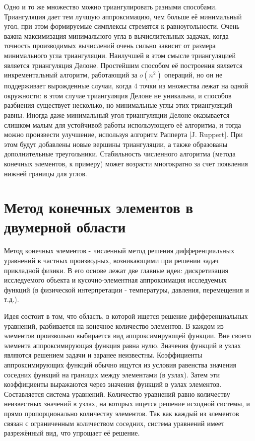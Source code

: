 \documentclass[14pt]{extreport}
\begin{document}
Одно и то же множество можно триангулировать разными способами. Триангуляция дает тем лучшую аппроксимацию, чем больше её минимальный угол, при этом формируемые симплексы стремятся к равноугольности. Очень важна максимизация минимального угла в вычислительных задачах, когда точность производимых вычислений очень сильно зависит от размера минимального угла триангуляции. Наилучшей в этом смысле триангуляцией является триангуляция Делоне. Простейшим способом её построения является инкрементальный алгоритм, работающий за $o(n^2)$ операций, но он не поддерживает вырожденные случаи, когда $4$ точки из множества лежат на одной окружности: в этом случае триангуляция Делоне не уникальна, и способов разбиения существует несколько, но минимальные углы этих триангуляций равны. Иногда даже минимальный угол триангуляции Делоне оказывается слишком малым для устойчивой работы использующего её алгоритма, и тогда можно произвести улучшение, используя алгоритм Рапперта [J. Ruppert]. При этом будут добавлены новые вершины триангуляции, а также образованы дополнительные треугольники. Стабильность численного алгоритма (метода конечных элементов, к примеру) может возрасти многократно за счет появления нижней границы для углов. 

\section{Метод конечных элементов в двумерной области}

Метод конечных элементов \cite{bib:fem:pankratov, bib:fem:zenkevich} - численный метод решения дифференциальных уравнений в частных производных, возникающими при решении задач прикладной физики.
	В его основе лежат две главные идеи: дискретизация исследуемого объекта и кусочно-элементная аппроксимация исследуемых функций (в физической интерпретации - температуры, давления, перемещения и т.д.).

Идея состоит в том, что область, в которой ищется решение дифференциальных уравнений, разбивается на конечное количество элементов. В каждом из элементов произвольно выбирается вид аппроксимирующей функции. Вне своего элемента аппроксимирующая функция равна нулю. Значения функций в узлах являются решением задачи и заранее неизвестны. Коэффициенты аппроксимирующих функций обычно ищутся из условия равенства значения соседних функций на границах между элементами (в узлах). Затем эти коэффициенты выражаются через значения функций в узлах элементов. Составляется система уравнений. Количество уравнений равно количеству неизвестных значений в узлах, на которых ищется решение исходной системы, и прямо пропорционально количеству элементов. Так как каждый из элементов связан с ограниченным количеством соседних, система уравнений имеет разрежённый вид, что упрощает её решение. 
\end{document}
